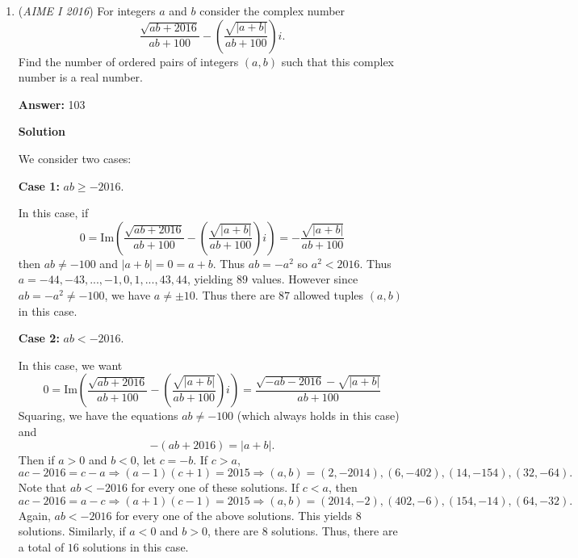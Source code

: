 \begin{enumerate}
 Let $C_2\in AB$ such that $CC_2\perp AB$. Then $CC_2=\frac{2[ABC]}{c}$. Using the area formula $[ABC]=rs$ and our fact from above yields $CC_2=\frac{8}{3}r$. We then notice that $\triangle CC_2L\sim\triangle IC_1L$, so if we let $x=CI$, by triangle ratios we find that $\frac{\frac{8}{3}r}{x+2}=\frac{r}{2}$, leading to $x=\frac{10}{3}$. Thus the answer is $10+3=\boxed{013}$.

 


	\item (\textit{AIME I 2016}) For integers $a$ and $b$ consider the complex number 
 \[\frac{\sqrt{ab+2016}}{ab+100}-\left(\frac{\sqrt{|a+b|}}{ab+100}\right)i.\] Find the number of ordered pairs of integers $(a,b)$ such that this complex number is a real number.


 
 \textbf{Answer: }103



\textbf{Solution}

We consider two cases:

 \textbf{Case 1:} $ab \ge -2016$.  

 In this case, if
 \[0 = \text{Im}\left({\frac{\sqrt{ab+2016}}{ab+100}-\left({\frac{\sqrt{|a+b|}}{ab+100}}\right)i}\right) = -\frac{\sqrt{|a+b|}}{ab+100}\]then $ab \ne -100$ and $|a + b| = 0 = a + b$.  Thus $ab = -a^2$ so $a^2 < 2016$.  Thus $a = -44,-43, ... , -1, 0, 1, ..., 43, 44$, yielding $89$ values. However since $ab = -a^2 \ne -100$,  we have $a \ne \pm 10$.  Thus there are $87$ allowed tuples $(a,b)$ in this case.

 \textbf{Case 2:} $ab < -2016$. 

 In this case, we want
 \[0 = \text{Im}\left({\frac{\sqrt{ab+2016}}{ab+100}-\left({\frac{\sqrt{|a+b|}}{ab+100}}\right)i}\right) = \frac{\sqrt{-ab-2016} - \sqrt{|a+b|}}{ab+100}\]Squaring, we have the equations $ab \ne -100$ (which always holds in this case) and 
 \[-(ab + 2016)= |a + b|.\]Then if $a > 0$ and $b < 0$, let $c = -b$.  If $c > a$, 
 \[ac - 2016 = c - a \Rightarrow (a - 1)(c + 1) = 2015 \Rightarrow (a,b) = (2, -2014), (6, -402), (14, -154), (32, -64).\]Note that $ab < -2016$ for every one of these solutions.  If $c < a$, then
 \[ac - 2016 = a - c \Rightarrow (a + 1)(c - 1) = 2015 \Rightarrow (a,b) = (2014, -2), (402, -6), (154, -14), (64, -32).\]Again, $ab < -2016$ for every one of the above solutions. This yields $8$ solutions.  Similarly, if $a < 0$ and $b > 0$, there are $8$ solutions.  Thus, there are a total of $16$ solutions in this case.


\end{enumerate}
